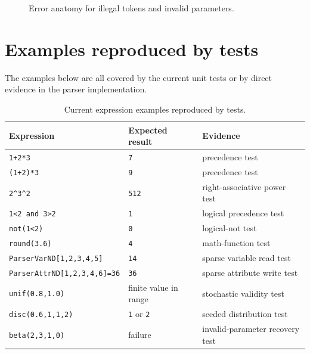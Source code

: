 \begin{figure}[htbp]
\centering
\caption{Error anatomy for illegal tokens and invalid parameters.}
\label{fig:expression-error-anatomy}
\end{figure}

\section{Examples reproduced by tests}
\label{sec:expression-reference-examples}

The examples below are all covered by the current unit tests or by direct
evidence in the parser implementation.

\begin{table}[htbp]
\centering
\caption{Current expression examples reproduced by tests.}
\label{tab:expression-reference-examples}
\small
\begin{tabular}{|p{5.2cm}|p{3.0cm}|p{4.7cm}|}
\hline
\textbf{Expression} & \textbf{Expected result} & \textbf{Evidence} \\
\hline
\texttt{1+2*3} & \texttt{7} & precedence test \\
\hline
\texttt{(1+2)*3} & \texttt{9} & precedence test \\
\hline
\verb|2^3^2| & \texttt{512} & right-associative power test \\
\hline
\texttt{1<2 and 3>2} & \texttt{1} & logical precedence test \\
\hline
\texttt{not(1<2)} & \texttt{0} & logical-not test \\
\hline
\texttt{round(3.6)} & \texttt{4} & math-function test \\
\hline
\texttt{ParserVarND[1,2,3,4,5]} & \texttt{14} & sparse variable read test \\
\hline
\texttt{ParserAttrND[1,2,3,4,6]=36} & \texttt{36} & sparse attribute write test \\
\hline
\texttt{unif(0.8,1.0)} & finite value in range & stochastic validity test \\
\hline
\texttt{disc(0.6,1,1,2)} & \texttt{1} or \texttt{2} & seeded distribution test \\
\hline
\texttt{beta(2,3,1,0)} & failure & invalid-parameter recovery test \\
\hline
\end{tabular}
\end{table}

